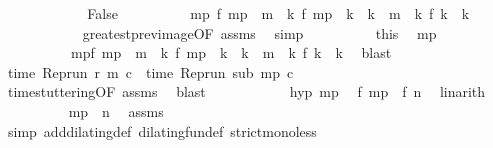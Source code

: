 \begin{isabellebody}
\ \ \ \ \isamarkupfalse%
\isanewline
\ \ \ \ \ \ \isamarkupfalse%
\ False\isanewline
\ \ \ \ \ \ \ \ \isamarkupfalse%
\ {\isacartoucheopen}{\isasymexists}m\isactrlsub p{\isachardot}\ f\ m\isactrlsub p\ {\isacharless}\ m\ {\isasymand}\ {\isacharparenleft}{\isasymforall}k{\isachardot}\ f\ m\isactrlsub p\ {\isacharless}\ k\ {\isasymand}\ k\ {\isasymle}\ m\ {\isasymlongrightarrow}\ {\isacharparenleft}{\isasymnexists}k\ f\ k\ {\isacharequal}\ k{\isacharparenright}{\isacharparenright}{\isacartoucheclose}\isanewline
\ \ \ \ \ \ \ \ \ \ \isamarkupfalse%
\ greatest{\isacharunderscore}prev{\isacharunderscore}image{\isacharbrackleft}OF\ assms{\isacharbrackright}\ \isamarkupfalse%
\ simp\isanewline
\ \ \ \ \ \ \ \ \isamarkupfalse%
\ this\ \isamarkupfalse%
\ m\isactrlsub p\ \isanewline
\ \ \ \ \ \ \ \ \ \ mp{\isacharcolon}{\isacartoucheopen}f\ m\isactrlsub p\ {\isacharless}\ m\ {\isasymand}\ {\isacharparenleft}{\isasymforall}k{\isachardot}\ f\ m\isactrlsub p\ {\isacharless}\ k\ {\isasymand}\ k\ {\isasymle}\ m\ {\isasymlongrightarrow}\ {\isacharparenleft}{\isasymnexists}k\ f\ k\ {\isacharequal}\ k{\isacharparenright}{\isacharparenright}{\isacartoucheclose}\ \isamarkupfalse%
\ blast\isanewline
\ \ \ \ \ \ \ \ \isamarkupfalse%
\ {\isacartoucheopen}time\ {\isacharparenleft}{\isacharparenleft}Rep{\isacharunderscore}run\ r{\isacharparenright}\ m\ c{\isacharparenright}\ {\isacharequal}\ time\ {\isacharparenleft}{\isacharparenleft}Rep{\isacharunderscore}run\ sub{\isacharparenright}\ m\isactrlsub p\ c{\isacharparenright}{\isacartoucheclose}\isanewline
\ \ \ \ \ \ \ \ \ \ \isamarkupfalse%
\ time{\isacharunderscore}stuttering{\isacharbrackleft}OF\ assms{\isacharbrackright}\ \isamarkupfalse%
\ blast\isanewline
\ \ \ \ \ \ \ \ \isamarkupfalse%
\ \isamarkupfalse%
\ hyp\ mp\ \isamarkupfalse%
\ {\isacartoucheopen}f\ m\isactrlsub p\ {\isacharless}\ f\ n{\isacartoucheclose}\ \isamarkupfalse%
\ linarith\isanewline
\ \ \ \ \ \ \ \ \isamarkupfalse%
\ {\isacartoucheopen}m\isactrlsub p\ {\isacharless}\ n{\isacartoucheclose}\ \isamarkupfalse%
\ assms\isanewline
\ \ \ \ \ \ \ \ \ \ \isamarkupfalse%
\ {\isacharparenleft}simp\ add{\isacharcolon}dilating{\isacharunderscore}def\ dilating{\isacharunderscore}fun{\isacharunderscore}def\ strict{\isacharunderscore}mono{\isacharunderscore}less{\isacharparenright}\isanewline

\end{isabellebody}
